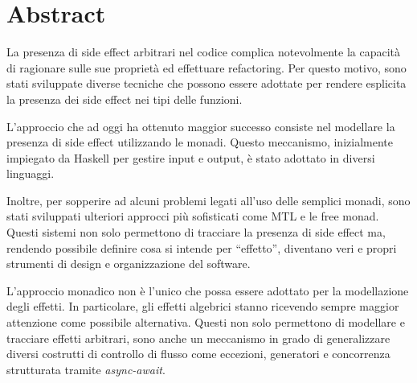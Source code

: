 \chapter*{Abstract}

La presenza di side effect arbitrari nel codice complica notevolmente la capacità di ragionare sulle sue proprietà ed effettuare refactoring.
Per questo motivo, sono stati sviluppate diverse tecniche che possono essere adottate per rendere esplicita la presenza dei side effect nei tipi delle funzioni.

L'approccio che ad oggi ha ottenuto maggior successo consiste nel modellare la presenza di side effect utilizzando le monadi.
Questo meccanismo, inizialmente impiegato da Haskell per gestire input e output, è stato adottato in diversi linguaggi.

Inoltre, per sopperire ad alcuni problemi legati all'uso delle semplici monadi, sono stati sviluppati ulteriori approcci più sofisticati come MTL e le free monad.
Questi sistemi non solo permettono di tracciare la presenza di side effect ma, rendendo possibile definire cosa si intende per ``effetto'', diventano veri e propri strumenti di design e organizzazione del software.

L'approccio monadico non è l'unico che possa essere adottato per la modellazione degli effetti. In particolare, gli effetti algebrici stanno ricevendo sempre maggior attenzione come possibile alternativa.
Questi non solo permettono di modellare e tracciare effetti arbitrari, sono anche un meccanismo in grado di generalizzare diversi costrutti di controllo di flusso come eccezioni, generatori e concorrenza strutturata tramite \emph{async-await}.
